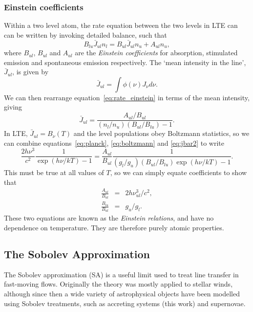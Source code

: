 \subsubsection{Einstein coefficients}

Within a two level atom, the rate equation between the two levels in LTE can
can be written by invoking detailed balance, such that 
\begin{equation}
B_{lu} \bar{J}_{ul} n_l = B_{ul} \bar{J}_{ul} n_u + A_{ul} n_u,
\label{eq:rate_einstein}
\end{equation}
where $B_{ul}$, $B_{ul}$ and $A_{ul}$ are the {\em Einstein coefficients}
for absorption, stimulated emission and spontaneous emission respectively.
The `mean intensity in the line', $\bar{J}_{ul}$, is given by
\begin{equation}
\bar{J}_{ul} = \int \phi(\nu) J_\nu d\nu.
\label{eq:jbar}
\end{equation}
We can then rearrange equation~\ref{eq:rate_einstein} in terms of 
the mean intensity, giving
\begin{equation}
\bar{J}_{ul} = \frac{A_{ul} / B_{ul}}{(n_l/n_u)(B_{ul}/B_{lu}) - 1}.
\label{eq:jbar2}
\end{equation}
In LTE, $\bar{J}_{ul} = B_\nu (T)$ and the level populations obey Boltzmann statistics, so we can combine equations~\ref{eq:planck}, \ref{eq:boltzmann}
and \ref{eq:jbar2} to write
\begin{equation}
\frac{2 h \nu^3}{c^2} \frac{1}{\exp(h\nu / kT) - 1} =
\frac{A_{ul}}{B_{ul}} \frac{1}{(g_l/g_u)(B_{ul}/B_{lu}) \exp(h\nu / kT) - 1}.
\end{equation}
This must be true at all values of $T$, so we can simply equate coefficients
to show that
\begin{eqnarray}
\frac{A_{ul}}{B_{ul}} &=& 2 h \nu_{ul}^3/c^2, \\  
\frac{B_{lu}}{B_{ul}} &=& g_u/g_l.  
 \label{eq:einstein_relations}     
\end{eqnarray}
These two equations are known as the {\em Einstein relations}, and have 
no dependence on temperature. They are therefore purely atomic properties.

\subsection{The Sobolev Approximation}
\label{sec:sobolev}
The Sobolev approximation (SA) is a useful limit 
used to treat line transfer in fast-moving flows. Originally 
the theory was mostly applied to stellar winds, although since then
a wide variety of astrophysical objects have been modelled using Sobolev treatments,
such as accreting systems (this work) and supernovae.

